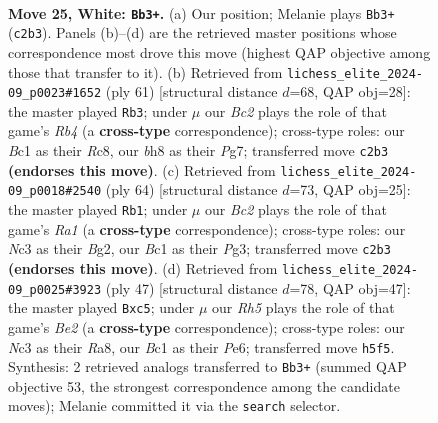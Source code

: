 \documentclass[11pt]{article}
\begin{document}
\clearpage

\begin{figure}[p]\centering
\begin{subfigure}{0.46\textwidth}\centering
\resizebox{\linewidth}{!}{%
\newchessgame
\chessboard[
  setfen={r4r1b/1ppb1k2/p2n4/4pp1R/8/P1N2N2/1PB1KPP1/R1B5 w - - 1 25},
  showmover=false,
  pgfstyle=straightmove, color=movearrow, markmove={c2-b3}
]}
\caption{}
\end{subfigure}\hfill
\begin{subfigure}{0.46\textwidth}\centering
\resizebox{\linewidth}{!}{%
\newchessgame
\chessboard[
  setfen={2r2bk1/5pp1/4p1p1/1r1n4/3BR3/3N3P/1P3PP1/4R1K1 b - - 3 31},
  showmover=false,
  pgfstyle=straightmove, color=movearrow, markmove={b5-b3}
]}
\caption{}
\end{subfigure}
\\[4pt]
\begin{subfigure}{0.46\textwidth}\centering
\resizebox{\linewidth}{!}{%
\newchessgame
\chessboard[
  setfen={1k1rr3/1b1p2p1/p1n3N1/4pP2/2R1P3/2P3P1/5KB1/R7 w - - 1 33},
  showmover=false,
  pgfstyle=straightmove, color=movearrow, markmove={a1-b1}
]}
\caption{}
\end{subfigure}\hfill
\begin{subfigure}{0.46\textwidth}\centering
\resizebox{\linewidth}{!}{%
\newchessgame
\chessboard[
  setfen={r5k1/4bppp/4p3/1rPnN3/8/pP6/P2B1PPP/R1R3K1 b - - 0 24},
  showmover=false,
  pgfstyle=straightmove, color=movearrow, markmove={e7-c5}
]}
\caption{}
\end{subfigure}
\caption{\textbf{Move 25, White: \texttt{Bb3+}.} (a) Our position; Melanie plays \texttt{Bb3+} (\texttt{c2b3}). Panels (b)--(d) are the retrieved master positions whose correspondence most drove this move (highest QAP objective among those that transfer to it). (b) Retrieved from \texttt{lichess\_elite\_2024-09\_p0023\#1652} (ply 61) [structural distance $d$=68, QAP obj=28]: the master played \texttt{Rb3}; under $\mu$ our \emph{Bc2} plays the role of that game's \emph{Rb4} (a \textbf{cross-type} correspondence); cross-type roles: our \emph{B}c1 as their \emph{R}c8, our \emph{b}h8 as their \emph{P}g7; transferred move \texttt{c2b3} \textbf{(endorses this move)}. (c) Retrieved from \texttt{lichess\_elite\_2024-09\_p0018\#2540} (ply 64) [structural distance $d$=73, QAP obj=25]: the master played \texttt{Rb1}; under $\mu$ our \emph{Bc2} plays the role of that game's \emph{Ra1} (a \textbf{cross-type} correspondence); cross-type roles: our \emph{N}c3 as their \emph{B}g2, our \emph{B}c1 as their \emph{P}g3; transferred move \texttt{c2b3} \textbf{(endorses this move)}. (d) Retrieved from \texttt{lichess\_elite\_2024-09\_p0025\#3923} (ply 47) [structural distance $d$=78, QAP obj=47]: the master played \texttt{Bxc5}; under $\mu$ our \emph{Rh5} plays the role of that game's \emph{Be2} (a \textbf{cross-type} correspondence); cross-type roles: our \emph{N}c3 as their \emph{R}a8, our \emph{B}c1 as their \emph{P}e6; transferred move \texttt{h5f5}. Synthesis: 2 retrieved analogs transferred to \texttt{Bb3+} (summed QAP objective 53, the strongest correspondence among the candidate moves); Melanie committed it via the \texttt{search} selector.}
\label{fig:thought-m48}
\end{figure}
\end{document}
